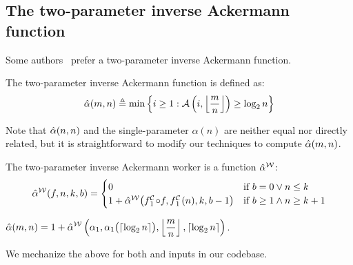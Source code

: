 \subsection{The two-parameter inverse Ackermann function}
Some authors~\cite{chazelle,tarjan} prefer a two-parameter inverse Ackermann function.
\begin{defn} \label{defn: 2para-alpha}
	The two-parameter inverse Ackermann function is defined as:
	\begin{equation} \label{eq: tmp-2para-alpha}
	\hat{\alpha} (m, n) \triangleq \min\left\{i \ge 1 : \mathcal{A}\left(i, \left\lfloor \frac{m}{n} \right\rfloor \right)\ge \log_2n \right\}
	\end{equation}
\end{defn}
Note that $\hat{\alpha}(n, n)$ and the single-parameter $\alpha(n)$
are neither equal nor directly related, but
it is straightforward to modify our techniques to compute $\hat{\alpha}(m, n)$.
\begin{defn} \label{defn: 2para-inv-ack-worker}
	The two-parameter inverse Ackermann worker is a function $\hat{\alpha}^{\mathcal{W}}$:
	\begin{equation} \label{eq: 2para-inv-ack-worker-recursion}
	\ackt^{\W}(f, n, k, b) = \begin{cases}
	0 & \text{if } b = 0 \vee n\le k \\ 1 + \ackt^{\W}\big(\cdt{f}{1}\circ f , \cdt{f}{1}(n), k, b-1\big) & \text{if } b \ge 1 \wedge n \ge k+1
	\end{cases}
	\end{equation}
\end{defn}
\begin{thm}
	$\displaystyle \hat{\alpha}(m, n) = 1 + \hat{\alpha}^{\mathcal{W}}\left(\alpha_1, \alpha_1\big(\lceil\log_2n \rceil\big), \left\lfloor \frac{m}{n} \right\rfloor, \lceil\log_2n \rceil \right)$.
\end{thm}
We mechanize the above for both  and  inputs in our codebase.

